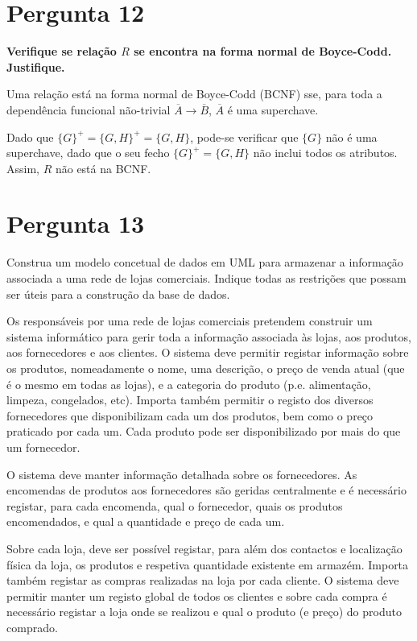 {\section{Pergunta 12}
\textbf{Verifique se relação $R$ se encontra na forma normal de Boyce-Codd. Justifique.}

\ansseparator

Uma relação está na forma normal de Boyce-Codd (BCNF) sse, para toda a dependência funcional não-trivial $\overline{A} \rightarrow \overline{B}$, $\overline{A}$ é uma superchave.

Dado que $\{G\}^+=\{G,H\}^+=\{G,H\}$, pode-se verificar que $\{G\}$ não é uma superchave, dado que o seu fecho $\{G\}^+=\{G,H\}$ não inclui todos os atributos. Assim, $R$ não está na BCNF.

\section{Pergunta 13}
Construa um modelo concetual de dados em UML para armazenar a informação associada a uma rede de lojas comerciais. Indique todas as restrições que possam ser úteis para a construção da base de dados.

Os responsáveis por uma rede de lojas comerciais pretendem construir um sistema informático para gerir toda a informação associada às lojas, aos produtos, aos fornecedores e aos clientes. O sistema deve permitir registar informação sobre os produtos, nomeadamente o nome, uma descrição, o preço de venda atual (que é o mesmo em todas as lojas), e a categoria do produto (p.e. alimentação, limpeza, congelados, etc). Importa também permitir o registo dos diversos fornecedores que disponibilizam cada um dos produtos, bem como o preço praticado por cada um. Cada produto pode ser disponibilizado por mais do que um fornecedor.

O sistema deve manter informação detalhada sobre os fornecedores. As encomendas de produtos aos fornecedores são geridas centralmente e é necessário registar, para cada encomenda, qual o fornecedor, quais os produtos encomendados, e qual a quantidade e preço de cada um.

Sobre cada loja, deve ser possível registar, para além dos contactos e localização física da loja, os produtos e respetiva quantidade existente em armazém. Importa também registar as compras realizadas na loja por cada cliente. O sistema deve permitir manter um registo global de todos os clientes e sobre cada compra é necessário registar a loja onde se realizou e qual o produto (e preço) do produto comprado.

}
